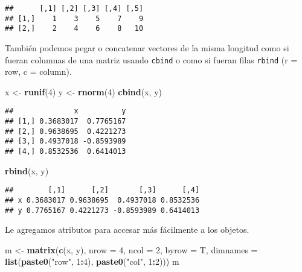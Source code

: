 \documentclass[]{article}
\newenvironment{Shaded}{\begin{snugshade}}{\end{snugshade}}
\newcommand{\KeywordTok}[1]{\textcolor[rgb]{0.13,0.29,0.53}{\textbf{#1}}}
\newcommand{\DataTypeTok}[1]{\textcolor[rgb]{0.13,0.29,0.53}{#1}}
\newcommand{\DecValTok}[1]{\textcolor[rgb]{0.00,0.00,0.81}{#1}}
\newcommand{\StringTok}[1]{\textcolor[rgb]{0.31,0.60,0.02}{#1}}
\newcommand{\OperatorTok}[1]{\textcolor[rgb]{0.81,0.36,0.00}{\textbf{#1}}}
\newcommand{\NormalTok}[1]{#1}
\begin{document}
\begin{verbatim}
##      [,1] [,2] [,3] [,4] [,5]
## [1,]    1    3    5    7    9
## [2,]    2    4    6    8   10
\end{verbatim}

También podemos pegar o concatenar vectores de la misma longitud como si
fueran columnas de una matriz usando \texttt{cbind} o como si fueran
filas \texttt{rbind} (r = row, c = column).

\begin{Shaded}
\begin{Highlighting}[]
\NormalTok{x <-}\StringTok{ }\KeywordTok{runif}\NormalTok{(}\DecValTok{4}\NormalTok{)}
\NormalTok{y <-}\StringTok{ }\KeywordTok{rnorm}\NormalTok{(}\DecValTok{4}\NormalTok{)}
\KeywordTok{cbind}\NormalTok{(x, y)}
\end{Highlighting}
\end{Shaded}

\begin{verbatim}
##              x          y
## [1,] 0.3683017  0.7765167
## [2,] 0.9638695  0.4221273
## [3,] 0.4937018 -0.8593989
## [4,] 0.8532536  0.6414013
\end{verbatim}

\begin{Shaded}
\begin{Highlighting}[]
\KeywordTok{rbind}\NormalTok{(x, y)}
\end{Highlighting}
\end{Shaded}

\begin{verbatim}
##        [,1]      [,2]       [,3]      [,4]
## x 0.3683017 0.9638695  0.4937018 0.8532536
## y 0.7765167 0.4221273 -0.8593989 0.6414013
\end{verbatim}

Le agregamos atributos para accesar más fácilmente a los objetos.

\begin{Shaded}
\begin{Highlighting}[]
\NormalTok{m <-}\StringTok{ }\KeywordTok{matrix}\NormalTok{(}\KeywordTok{c}\NormalTok{(x, y), }\DataTypeTok{nrow =} \DecValTok{4}\NormalTok{, }\DataTypeTok{ncol =} \DecValTok{2}\NormalTok{, }\DataTypeTok{byrow =}\NormalTok{ T,}
            \DataTypeTok{dimnames =} \KeywordTok{list}\NormalTok{(}\KeywordTok{paste0}\NormalTok{(}\StringTok{"row"}\NormalTok{, }\DecValTok{1}\OperatorTok{:}\DecValTok{4}\NormalTok{),}
                            \KeywordTok{paste0}\NormalTok{(}\StringTok{"col"}\NormalTok{, }\DecValTok{1}\OperatorTok{:}\DecValTok{2}\NormalTok{)))}
\NormalTok{m}
\end{Highlighting}
\end{Shaded}
\end{document}
